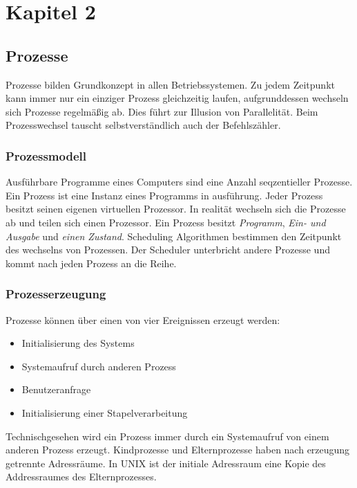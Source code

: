 \chapter{Kapitel 2}

\section{Prozesse}

Prozesse bilden Grundkonzept in allen Betriebssystemen. Zu jedem Zeitpunkt kann
immer nur ein einziger Prozess gleichzeitig laufen, aufgrunddessen wechseln
sich Prozesse regelmäßig ab. Dies führt zur Illusion von Parallelität. Beim
Prozesswechsel tauscht selbstverständlich auch der Befehlszähler.

\subsection{Prozessmodell}

Ausführbare Programme eines Computers sind eine Anzahl seqzentieller Prozesse.
Ein Prozess ist eine Instanz eines Programms in ausführung. Jeder Prozess
besitzt seinen eigenen virtuellen Prozessor. In realität wechseln sich die
Prozesse ab und teilen sich einen Prozessor. Ein Prozess besitzt
\textit{Programm}, \textit{Ein- und Ausgabe} und \textit{einen Zustand}.
Scheduling Algorithmen bestimmen den Zeitpunkt des wechselns von Prozessen. Der
Scheduler unterbricht andere Prozesse und kommt nach jeden Prozess an die
Reihe.

\subsection{Prozesserzeugung}

Prozesse können über einen von vier Ereignissen erzeugt werden:

\begin{itemize}
    \item Initialisierung des Systems
    \item Systemaufruf durch anderen Prozess
    \item Benutzeranfrage
    \item Initialisierung einer Stapelverarbeitung
\end{itemize}

Technischgesehen wird ein Prozess immer durch ein Systemaufruf von einem
anderen Prozess erzeugt. Kindprozesse und Elternprozesse haben nach erzeugung
getrennte Adressräume. In UNIX ist der initiale Adressraum eine Kopie des
Addressraumes des Elternprozesses.

